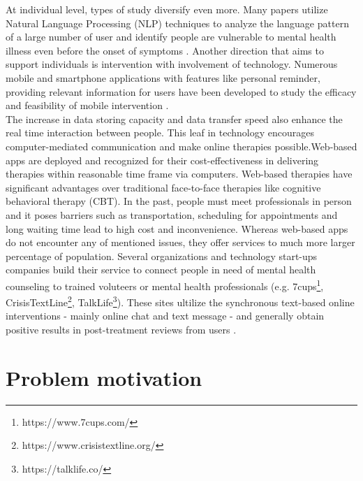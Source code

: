 At individual level, types of study diversify even more. Many papers utilize Natural Language Processing (NLP) techniques to analyze the language pattern of a large number of user and identify people are vulnerable to mental health illness even before the onset of symptoms \cite{Almeida, DeChoudhury2013}. Another direction that aims to support individuals is intervention with involvement of technology. Numerous mobile and smartphone applications with features like personal reminder, providing relevant information for users have been developed to study the efficacy and feasibility of mobile intervention \cite{Rathbone2017}. \\

The increase in data storing capacity and data transfer speed also enhance the real time interaction between people. This leaf in technology encourages computer-mediated communication and make online therapies possible.Web-based apps are deployed and recognized for their cost-effectiveness in delivering therapies within reasonable time frame via computers. Web-based therapies have significant advantages over traditional face-to-face therapies like cognitive behavioral therapy (CBT). In the past, people must meet professionals in person and it poses barriers such as transportation, scheduling for appointments and long waiting time lead to high cost and inconvenience. Whereas web-based apps do not encounter any of mentioned issues, they offer services to much more larger percentage of population. Several organizations and technology start-ups companies build their service to connect people in need of mental health counseling to trained voluteers or mental health professionals (e.g. 7cups\footnote{https://www.7cups.com/}, CrisisTextLine\footnote{https://www.crisistextline.org/}, TalkLife\footnote{https://talklife.co/}). These sites ultilize the synchronous text-based online interventions - mainly online chat and text message - and generally obtain positive results in post-treatment reviews from users \cite{Hoermann2017}.\\

\section{Problem motivation}

